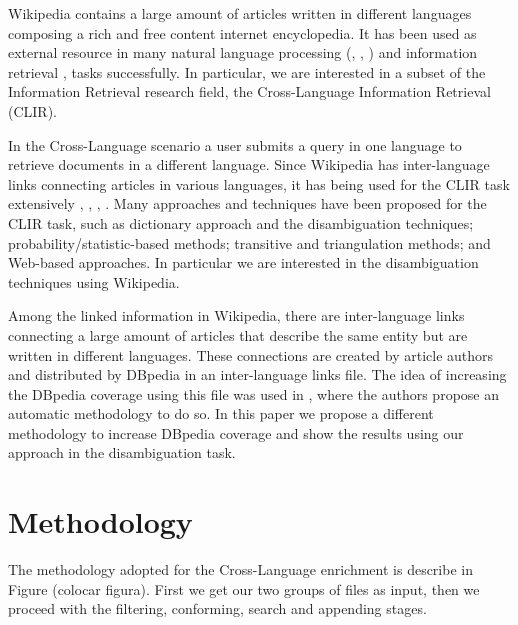 \documentclass[10pt,a4paper]{llncs}
\begin{document}
Wikipedia contains a large amount of articles written in different languages composing a rich and free content internet encyclopedia. It has been used as external resource in many natural language processing (\cite{buscaldi_rosso}, \cite{mihalcea}, \cite{erdmann}) and information retrieval \cite{egozi}, \cite{milne} tasks successfully. In particular, we are interested in a subset of the Information Retrieval research field, the Cross-Language Information Retrieval (CLIR).

In the Cross-Language scenario a user submits a query in one language to retrieve documents in a different language. Since Wikipedia has inter-language links connecting articles in various languages, it has being used for the CLIR task extensively \cite{sorg}, \cite{nguyen}, \cite{nie}, \cite{braschler}. Many approaches and techniques have been proposed for the CLIR task, such as dictionary approach and the disambiguation techniques; probability/statistic-based methods; transitive and triangulation methods; and Web-based approaches. In particular we are interested in the disambiguation techniques using Wikipedia. 

Among the linked information in Wikipedia, there are inter-language links connecting a large amount of articles that describe the same entity but are written in different languages. These connections are created by article authors and distributed by DBpedia in an inter-language links file. The idea of increasing the DBpedia coverage using this file was used in \cite{aprosio}, where the authors propose an automatic methodology to do so. In this paper we propose a different methodology to increase DBpedia coverage and show the results using our approach in the disambiguation task.


\section{Methodology}

The methodology adopted for the Cross-Language enrichment is describe in Figure (colocar figura). First we get our two groups of files as input, then we proceed with the filtering, conforming, search and appending stages.
\end{document}
